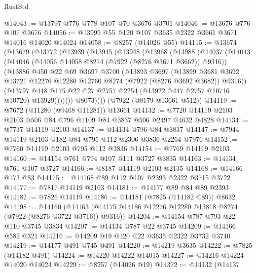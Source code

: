 \begin{lexlean}{RustStd}
\begin{coremodule}
@14043 := @13797 @776 @778 @107 @70 @3676 @3701
@14046 := @13676 @776 @107 @3676
@14056 := @13999 @55 @120 @107 @3635 @2322 @3661 @3671 @14016 @14020 @14024
@14058 := @8257 (@14026 @55)
@14115 := @13674
    (@13679
      (@13772
        (@13939
          (@13945
            (@13948
              (@13968
                (@13988
                  (@14037
                    (@14043
                      (@14046 (@14056 @14058 @8274 (@7922 (@8276 @3671 @3662)) @9316))
                      (@13886
                        @450
                        @22
                        @69
                        @3697
                        @3700
                        (@13893
                          @3697
                          (@13899
                            @3681
                            @3692
                            @13721
                            @12276
                            @12280
                            @12760
                            @8274
                            (@7922 (@8276 @3692 @3682))
                            @9316))
                        (@13797
                          @448
                          @175
                          @22
                          @27
                          @2757
                          @2254
                          (@13922 @447 @2757 @10716 @10720)
                          @13929)))))))
            @8073))))
    (@7922 (@8179 @13661 @512))
@14119 := @7672 (@11280 (@9468 @11281)) @13661
@14132 := @7720 @14119 @2103 @2103 @506 @84 @796 @1109 @84 @3837 @506 @2497 @4632 @4828
@14134 := @7737 @14119 @2103
@14137 := @14134 @796 @84 @3837
@14147 := @7944 @14119 @2103 @182 @84 @795 @112 @2306 @3836 @2264 @7976
@14152 := @7760 @14119 @2103 @795 @112 @3836
@14154 := @7769 @14119 @2103
@14160 := @14154 @761 @794 @107 @111 @3727 @3835
@14163 := @14134 @761 @107 @3727
@14166 := @8187 @14119 @2103 @2135
@14168 := @14166 @173 @83
@14175 := @14168 @89 @112 @107 @2393 @2322 @3715 @3722
@14177 := @7817 @14119 @2103
@14181 := @14177 @89 @84 @89 @2393
@14182 := @7826 @14119
@14186 := @14181 (@7825 (@14182 @89)) @8632
@14198 := @14160
    (@14163 (@14175 @14186 @12276 @12280 @13818 @8274 (@7922 (@8276 @3722 @3716)) @9316))
@14204 := @14154 @787 @793 @22 @110 @3745 @3834
@14207 := @14134 @787 @22 @3745
@14209 := @14166 @582 @321
@14216 := @14209 @19 @120 @22 @3635 @2322 @3732 @3740
@14219 := @14177 @491 @745 @491
@14220 := @14219 @3635
@14222 := @7825 (@14182 @491)
@14224 := @14220 @14222 @14015
@14227 := @14216 @14224 @14020 @14024
@14229 := @8257 (@14026 @19)
@14372 := @14132
    (@14137

\end{coremodule}
\end{lexlean}
